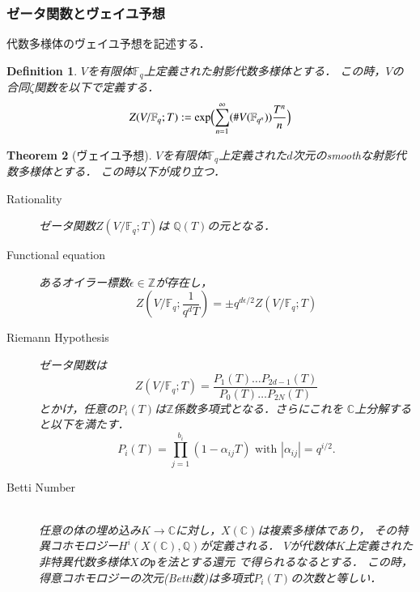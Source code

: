 \documentclass{ujarticle}
\newtheorem{thm}{Theorem}[section]
\newtheorem{dfn}[thm]{Definition}
\begin{document}
\subsubsection{ゼータ関数とヴェイユ予想}
\label{subs:ゼータ関数とヴェイユ予想}

代数多様体のヴェイユ予想を記述する．
\begin{dfn}
    $V$を有限体$\mathbb{F}_q$上定義された射影代数多様体とする．
    この時，$V$の合同$\zeta$関数を以下で定義する．
    \begin{equation*}
     Z(V/\mathbb{F}_q;T):= \mathrm{exp}\Bigl( \sum_{n=1}^{\infty}(\#V(\mathbb{F}_{q^n}))\frac{T^n}{n} \Bigr)
    \end{equation*}
\end{dfn}

\begin{thm}[ヴェイユ予想]
  $V$を有限体$\mathbb{F}_q$上定義された$d$次元のsmoothな射影代数多様体とする．
  この時以下が成り立つ．
  \begin{description}
    \item[Rationality]
    ゼータ関数$Z(V/\mathbb{F}_q;T)$は
    $\mathbb{Q}(T)$の元となる．
    \item[Functional equation]
    あるオイラー標数$ \epsilon \in \mathbb{Z}$が存在し，
    \begin{equation}
      Z(V/\mathbb{F}_q;\frac{1}{q^dT})=\pm
      q^{d \epsilon/2}Z(V/\mathbb{F}_q;T)
    \end{equation}
    \item[Riemann Hypothesis]
    ゼータ関数は
    \begin{equation}
     Z(V/\mathbb{F}_q;T)=
     \frac{P_1(T)\dots P_{2d-1}(T)}{P_0(T)\dots P_{2N}(T)}
    \end{equation}
    とかけ，任意の$P_i(T)$は$\mathbb{Z}$係数多項式となる．さらにこれを
    $ \mathbb{C} $上分解すると以下を満たす．
    \begin{equation*}
     P_i(T)= \prod_{j=1}^{b_i}(1-\alpha_{ij}T) \mbox{ with }
      |\alpha_{ij}|=q^{i/2}.
    \end{equation*}
    \item[Betti Number] ~\\
    任意の体の埋め込み$K \to \mathbb{C}$に対し，$X(\mathbb{C})$は複素多様体であり，
    その特異コホモロジー$H^i(X(\mathbb{C}),\mathbb{Q})$が定義される．
    $V$が代数体$K$上定義された非特異代数多様体$X$の$\mathfrak{p}$を法とする還元
    で得られるなるとする．
    この時，得意コホモロジーの次元(Betti数)は多項式$P_i(T)$の次数と等しい．
  \end{description}
\end{thm}
\end{document}
